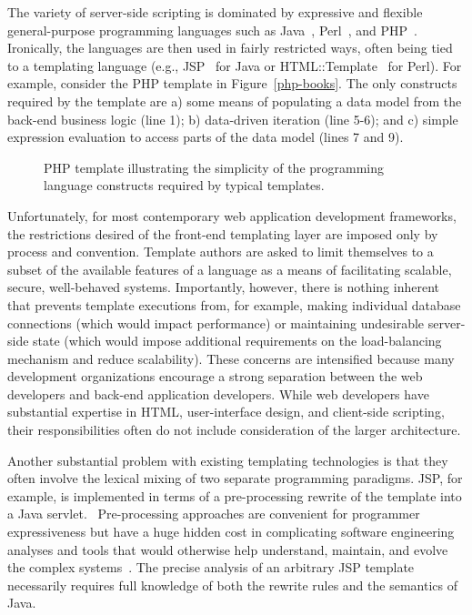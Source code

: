 \documentclass{www2003-submission}
\newcommand{\figref}[1]{Figure~\ref{#1}}
\begin{document}
The variety of server-side scripting is dominated by expressive and
flexible general-purpose programming languages such as
Java~\cite{Java}, Perl~\cite{Perl}, and PHP~\cite{PHP}.  Ironically,
the languages are then used in fairly restricted ways, often being
tied to a templating language (e.g., JSP~\cite{JSP} for Java or
HTML::Template~\cite{HTML-Template} for Perl).  For example, consider
the PHP template in \figref{php-books}.  The only constructs required
by the template are a) some means of populating a data model from the
back-end business logic (line 1); b) data-driven iteration (line
5-6); and c) simple expression evaluation to access parts of the data
model (lines 7 and 9). %

\begin{figure}[htbp]
\caption{PHP template illustrating the simplicity of the programming
language constructs required by typical templates.
\label{fig-php-template}}
\end{figure}

Unfortunately, for most contemporary web application development
frameworks, the restrictions desired of the front-end templating layer
are imposed only by process and convention.  Template authors are
asked to limit themselves to a subset of the available features of a
language as a means of facilitating scalable, secure, well-behaved
systems.  Importantly, however, there is nothing inherent that
prevents template executions from, for example, making individual
database connections (which would impact performance) or maintaining
undesirable server-side state (which would impose additional
requirements on the load-balancing mechanism and reduce scalability).
These concerns are intensified because many development organizations
encourage a strong separation between the web developers and back-end
application developers. While web developers have substantial
expertise in HTML, user-interface design, and client-side scripting,
their responsibilities often do not include consideration of the
larger architecture.

Another substantial problem with existing templating technologies is
that they often involve the lexical mixing of two separate programming
paradigms.  JSP, for example, is implemented in terms of a
pre-processing rewrite of the template into a Java servlet.~\cite{JaveServlet}
Pre-processing approaches are convenient for programmer expressiveness
but have a huge hidden cost in complicating software engineering
analyses and tools that would otherwise help understand, maintain, and
evolve the complex systems~\cite{PCP3,EvilMacros,StroustropDnEChapterAboutCpp}.
The precise analysis of an arbitrary JSP template necessarily requires
full knowledge of both the rewrite rules and the semantics of Java.
\end{document}
